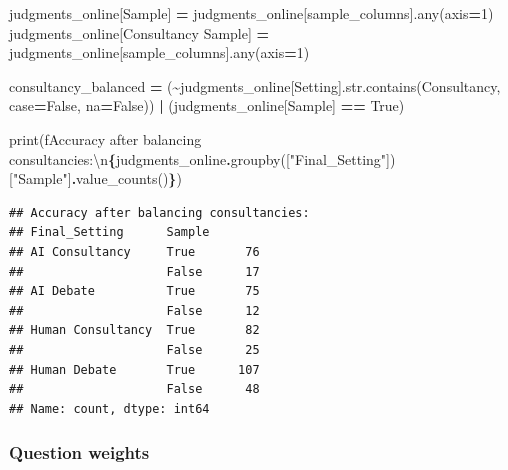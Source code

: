 \documentclass[
]{article}
\newenvironment{Shaded}{\begin{snugshade}}{\end{snugshade}}
\newcommand{\BuiltInTok}[1]{#1}
\newcommand{\CharTok}[1]{\textcolor[rgb]{0.31,0.60,0.02}{#1}}
\newcommand{\DecValTok}[1]{\textcolor[rgb]{0.00,0.00,0.81}{#1}}
\newcommand{\NormalTok}[1]{#1}
\newcommand{\OperatorTok}[1]{\textcolor[rgb]{0.81,0.36,0.00}{\textbf{#1}}}
\newcommand{\SpecialCharTok}[1]{\textcolor[rgb]{0.81,0.36,0.00}{\textbf{#1}}}
\newcommand{\SpecialStringTok}[1]{\textcolor[rgb]{0.31,0.60,0.02}{#1}}
\newcommand{\StringTok}[1]{\textcolor[rgb]{0.31,0.60,0.02}{#1}}
\newcommand{\VariableTok}[1]{\textcolor[rgb]{0.00,0.00,0.00}{#1}}
\begin{document}
\begin{Shaded}
\begin{Highlighting}[]
\NormalTok{judgments\_online[}\StringTok{\textquotesingle{}Sample\textquotesingle{}}\NormalTok{] }\OperatorTok{=}\NormalTok{ judgments\_online[sample\_columns].}\BuiltInTok{any}\NormalTok{(axis}\OperatorTok{=}\DecValTok{1}\NormalTok{)}
\NormalTok{judgments\_online[}\StringTok{\textquotesingle{}Consultancy Sample\textquotesingle{}}\NormalTok{] }\OperatorTok{=}\NormalTok{ judgments\_online[sample\_columns].}\BuiltInTok{any}\NormalTok{(axis}\OperatorTok{=}\DecValTok{1}\NormalTok{)}

\NormalTok{consultancy\_balanced }\OperatorTok{=}\NormalTok{ (}\OperatorTok{\textasciitilde{}}\NormalTok{judgments\_online[}\StringTok{\textquotesingle{}Setting\textquotesingle{}}\NormalTok{].}\BuiltInTok{str}\NormalTok{.contains(}\StringTok{\textquotesingle{}Consultancy\textquotesingle{}}\NormalTok{, case}\OperatorTok{=}\VariableTok{False}\NormalTok{, na}\OperatorTok{=}\VariableTok{False}\NormalTok{)) }\OperatorTok{|}\NormalTok{ (judgments\_online[}\StringTok{\textquotesingle{}Sample\textquotesingle{}}\NormalTok{] }\OperatorTok{==} \VariableTok{True}\NormalTok{)}

\BuiltInTok{print}\NormalTok{(}\SpecialStringTok{f\textquotesingle{}Accuracy after balancing consultancies:}\CharTok{\textbackslash{}n}\SpecialCharTok{\{}\NormalTok{judgments\_online}\SpecialCharTok{.}\NormalTok{groupby([}\StringTok{"Final\_Setting"}\NormalTok{])[}\StringTok{"Sample"}\NormalTok{]}\SpecialCharTok{.}\NormalTok{value\_counts()}\SpecialCharTok{\}}\SpecialStringTok{\textquotesingle{}}\NormalTok{)}
\end{Highlighting}
\end{Shaded}

\begin{verbatim}
## Accuracy after balancing consultancies:
## Final_Setting      Sample
## AI Consultancy     True       76
##                    False      17
## AI Debate          True       75
##                    False      12
## Human Consultancy  True       82
##                    False      25
## Human Debate       True      107
##                    False      48
## Name: count, dtype: int64
\end{verbatim}

\subsubsection{Question weights}\label{question-weights}
\end{document}
